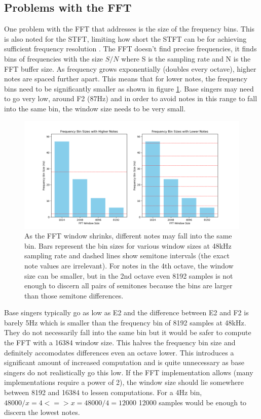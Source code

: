 \subsection{Problems with the FFT}
One problem with the FFT that   addresses is the size of the frequency bins. This is also noted for the STFT, limiting how short the STFT can be for achieving sufficient frequency resolution . The FFT doesn't find precise frequencies, it finds bins of frequencies with the size $S/N$ where S is the sampling rate and N is the FFT buffer size. As frequency grows exponentially (doubles every octave), higher notes are spaced further apart. This means that for lower notes, the frequency bins need to be significantly smaller as shown in figure \ref{fig:fftBinSizeChart}. Base singers may need to go very low, around F2 (87Hz) and in order to avoid notes in this range to fall into the same bin, the window size needs to be very small.  

\begin{figure}[ht]
    \centering
    \includegraphics[width=\textwidth]{./images/fft_bin_size_chart.png}
    \caption{As the FFT window shrinks, different notes may fall into the same bin. Bars represent the bin sizes for various window sizes at 48kHz sampling rate and dashed lines show semitone intervals (the exact note values are irrelevant). For notes in the 4th octave, the window size can be smaller, but in the 2nd octave even 8192 samples is not enough to discern all pairs of semitones because the bins are larger than those semitone differences.\label{fig:fftBinSizeChart}}
\end{figure}

Base singers typically go as low as E2 and the difference between E2 and F2 is barely 5Hz which is smaller than the frequency bin of 8192 samples at 48kHz. They do not necessarily fall into the same bin but it would be safer to compute the FFT with a 16384 window size. This halves the frequency bin size and definitely accomodates differences even an octave lower. This introduces a significant amount of increased computation and is quite unnecessary as base singers do not realistically go this low. If the FFT implementation allows (many implementations require a power of 2), the window size should lie somewhere between 8192 and 16384 to lessen computations. For a 4Hz bin, $48000/x = 4 <=> x = 48000/4 = 12000$ 12000 samples would be enough to discern the lowest notes. 

